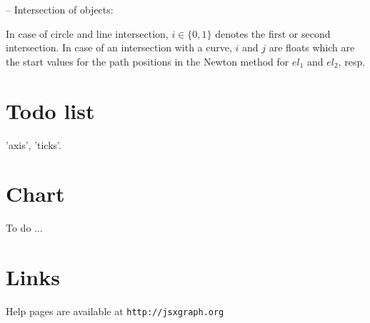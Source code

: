 {-- Intersection of objects:}\par
{}
\par
In case of circle and line intersection, $i\in\{0,1\}$ denotes 
the first or second intersection. In case of an intersection with a curve, $i$ and $j$ are floats
which are the start values for the path positions in the Newton method for $el_1$ and $el_2$, resp.

\section{Todo list}
'axis', 'ticks'.

\section{Chart}
To do $\ldots$


\section{Links}
Help pages are available at
{\tt http://jsxgraph.org}



\copyrightnotice
%

\bye

